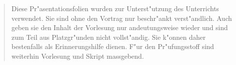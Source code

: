 \begin{quote}
Diese Pr"asentationsfolien wurden zur Unterst"utzung des Unterrichts verwendet.
Sie sind ohne den Vortrag nur beschr"ankt verst"andlich.
Auch geben sie den Inhalt der Vorlesung nur andeutungsweise wieder und sind
zum Teil aus Platzgr"unden nicht vollst"andig.
Sie k"onnen daher bestenfalls als Erinnerungshilfe dienen.
F"ur den Pr"ufungsstoff sind weiterhin Vorlesung und Skript massgebend.
\end{quote}
